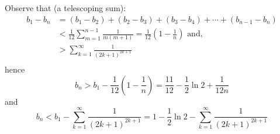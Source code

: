 \documentclass[11pt]{article}
\begin{document}
Observe that (a telescoping sum):
$$ 
\begin{aligned}
b_1 - b_n 
	&= (b_1 - b_2) + (b_2 - b_3) + (b_3 - b_4) + \cdots + (b_{n-1} - b_n) \\
	&< \frac{1}{12} \sum _{m=1} ^{n-1} \frac{1}{m(m+1)} = \frac{1}{12} \left( 1 - \frac{1}{n} \right) \text{\ \ and, } \\
	&>  \sum _{k=1} ^\infty \frac{1}{(2k+1)^{2k+1}} \\
\end{aligned}
$$
hence
$$ b_n > b_1 - \frac{1}{12} \left( 1 - \frac{1}{n} \right) = \frac{11}{12} - \frac{1}{2} \ln 2 + \frac{1}{12n}$$
and
$$ b_n < b_1 - \sum _{k=1} ^\infty \frac{1}{(2k+1)^{2k+1}} = 1 - \frac{1}{2} \ln 2 - \sum _{k=1} ^\infty \frac{1}{(2k+1)^{2k+1}} $$








\printbibliography [title={Reference}]


\end{document}
